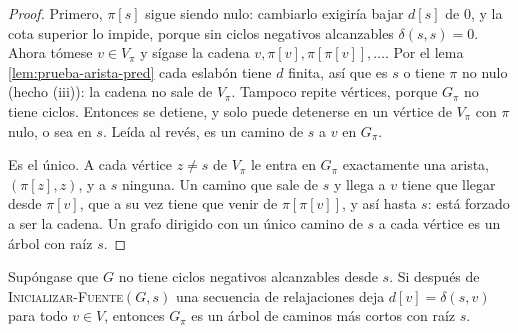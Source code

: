 \documentclass[11pt,letterpaper]{article}
\begin{document}
\begin{proof}
  Primero, $\pi[s]$ sigue siendo nulo: cambiarlo exigiría bajar $d[s]$
  de $0$, y la cota superior lo impide, porque sin ciclos negativos
  alcanzables $\delta(s, s) = 0$. Ahora tómese $v \in V_\pi$ y sígase
  la cadena $v, \pi[v], \pi[\pi[v]], \dots$. Por el lema
  \ref{lem:prueba-arista-pred} cada eslabón tiene $d$ finita, así que
  es $s$ o tiene $\pi$ no nulo (hecho (iii)): la cadena no sale de
  $V_\pi$. Tampoco repite vértices, porque $G_\pi$ no tiene ciclos.
  Entonces se detiene, y solo puede detenerse en un vértice de $V_\pi$
  con $\pi$ nulo, o sea en $s$. Leída al revés, es un camino de $s$ a
  $v$ en $G_\pi$.

  Es el único. A cada vértice $z \ne s$ de $V_\pi$ le entra en $G_\pi$
  exactamente una arista, $(\pi[z], z)$, y a $s$ ninguna. Un camino que
  sale de $s$ y llega a $v$ tiene que llegar desde $\pi[v]$, que a su
  vez tiene que venir de $\pi[\pi[v]]$, y así hasta $s$: está forzado a
  ser la cadena. Un grafo dirigido con un único camino de $s$ a cada
  vértice es un árbol con raíz $s$.
\end{proof}

\begin{lema}
  \label{lem:prueba-subgrafo-pred}
  Supóngase que $G$ no tiene ciclos negativos alcanzables desde $s$.
  Si después de \textsc{Inicializar-Fuente}$(G, s)$ una secuencia de
  relajaciones deja $d[v] = \delta(s, v)$ para todo $v \in V$,
  entonces $G_\pi$ es un árbol de caminos más cortos con raíz $s$.
\end{lema}
\end{document}
